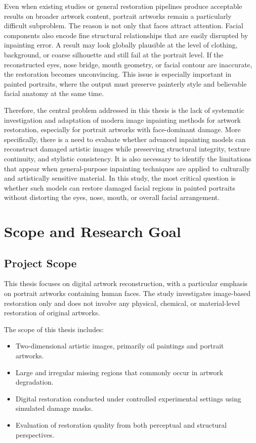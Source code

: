 \documentclass[12pt, twoside]{report}
\begin{document}
Even when existing studies or general restoration pipelines produce acceptable results on broader artwork content, portrait artworks remain a particularly difficult subproblem. The reason is not only that faces attract attention. Facial components also encode fine structural relationships that are easily disrupted by inpainting error. A result may look globally plausible at the level of clothing, background, or coarse silhouette and still fail at the portrait level. If the reconstructed eyes, nose bridge, mouth geometry, or facial contour are inaccurate, the restoration becomes unconvincing. This issue is especially important in painted portraits, where the output must preserve painterly style and believable facial anatomy at the same time.

Therefore, the central problem addressed in this thesis is the lack of systematic investigation and adaptation of modern image inpainting methods for artwork restoration, especially for portrait artworks with face-dominant damage. More specifically, there is a need to evaluate whether advanced inpainting models can reconstruct damaged artistic images while preserving structural integrity, texture continuity, and stylistic consistency. It is also necessary to identify the limitations that appear when general-purpose inpainting techniques are applied to culturally and artistically sensitive material. In this study, the most critical question is whether such models can restore damaged facial regions in painted portraits without distorting the eyes, nose, mouth, or overall facial arrangement.

\section{Scope and Research Goal}

\subsection{Project Scope}
This thesis focuses on digital artwork reconstruction, with a particular emphasis on portrait artworks containing human faces. The study investigates image-based restoration only and does not involve any physical, chemical, or material-level restoration of original artworks.

The scope of this thesis includes:
\begin{itemize}
    \item Two-dimensional artistic images, primarily oil paintings and portrait artworks.
    \item Large and irregular missing regions that commonly occur in artwork degradation.
    \item Digital restoration conducted under controlled experimental settings using simulated damage masks.
    \item Evaluation of restoration quality from both perceptual and structural perspectives.
\end{itemize}
\end{document}
